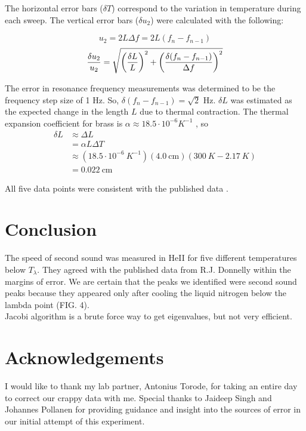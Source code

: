 \documentclass[prb,aps,twocolumn,showpacs,10pt]{revtex4-1}
\begin{document}
The horizontal error bars ($\delta T$) correspond to the variation in temperature during each sweep. The vertical error bars ($\delta u_2$) were calculated with the following:

\begin{equation}
u_2 = 2 L \Delta f = 2 L (f_n-f_{n-1})
\end{equation}
\begin{equation}
\frac{\delta u_2}{u_2} = \sqrt{\left( \frac{\delta L }{L} \right)^2 + \left( \frac{\delta (f_n-f_{n-1}) }{\Delta f} \right)^2}\\ \\
\end{equation}


The error in resonance frequency measurements was determined to be the frequency step size of 1 Hz. So, $\delta (f_n-f_{n-1}) = \sqrt{2}$ Hz. $\delta L$ was estimated as the expected change in the length $L$ due to thermal contraction. The thermal expansion coefficient for brass \cite{toolbox} is $\alpha \approx 18.5 \cdot 10^{-6} K^{-1}$ , so
\begin{equation}
\begin{aligned}
\delta L &\approx \Delta L \\
&= \alpha L \Delta T \\
&\approx(18.5 \cdot 10^{-6}\  K^{-1})(4.0 \ \text{cm})(300 \ K - 2.17 \ K) \\
&= 0.022 \  \text{cm}
\end{aligned}
\end{equation}

All five data points were consistent with the published data \cite{blah}.


\section{Conclusion}
The speed of second sound was measured in HeII for five different temperatures below $T_\lambda$. They agreed with the published data from R.J. Donnelly within the margins of error. We are certain that the peaks we identified were second sound peaks because they appeared only after cooling the liquid nitrogen below the lambda point (FIG. 4). \\


Jacobi algorithm is a brute force way to get eigenvalues, but not very efficient.





\section{Acknowledgements}
I would like to thank my lab partner, Antonius Torode, for taking an entire day to correct our crappy data with me. Special thanks to Jaideep Singh and Johannes Pollanen for providing guidance and insight into the sources of error in our initial attempt of this experiment. 
\end{document}
